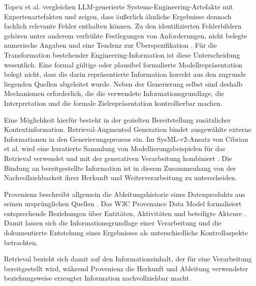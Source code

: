 Topcu et al. vergleichen LLM-generierte Systems-Engineering-Artefakte mit
Expertenartefakten und zeigen, dass äußerlich ähnliche Ergebnisse dennoch
fachlich relevante Fehler enthalten können. Zu den identifizierten
Fehlerbildern gehören unter anderem verfrühte Festlegungen von Anforderungen,
nicht belegte numerische Angaben und eine Tendenz zur Überspezifikation
\cite{Topcu2025}. Für die Transformation bestehender Engineering-Information
ist diese Unterscheidung wesentlich. Eine formal gültige oder plausibel
formulierte Modellrepräsentation belegt nicht, dass die darin repräsentierte
Information korrekt aus den zugrunde liegenden Quellen abgeleitet wurde.
Neben der Generierung selbst sind deshalb Mechanismen erforderlich, die die
verwendete Informationsgrundlage, die Interpretation und die formale
Zielrepräsentation kontrollierbar machen.

Eine Möglichkeit hierfür besteht in der gezielten Bereitstellung zusätzlicher
Kontextinformation. Retrieval-Augmented Generation bindet ausgewählte externe
Informationen in den Generierungsprozess ein. Im SysML-v2-Ansatz von Cibrian
et al. wird eine kuratierte Sammlung von Modellierungsbeispielen für das
Retrieval verwendet und mit der generativen Verarbeitung kombiniert
\cite{Cibrian.2025}. Die Bindung an bereitgestellte Information ist in diesem
Zusammenhang von der Nachvollziehbarkeit ihrer Herkunft und
Weiterverarbeitung zu unterscheiden.

Provenienz beschreibt allgemein die Ableitungshistorie eines Datenprodukts
aus seinen ursprünglichen Quellen \cite{Simmhan2005}. Das W3C Provenance Data
Model formalisiert entsprechende Beziehungen über Entitäten, Aktivitäten und
beteiligte Akteure \cite{MoreauMissier2013}. Damit lassen sich die
Informationsgrundlage einer Verarbeitung und die dokumentierte Entstehung
eines Ergebnisses als unterschiedliche Kontrollaspekte betrachten.

Retrieval bezieht sich damit auf den Informationsinhalt, der für eine
Verarbeitung bereitgestellt wird, während Provenienz die Herkunft und
Ableitung verwendeter beziehungsweise erzeugter Information nachvollziehbar
macht.

